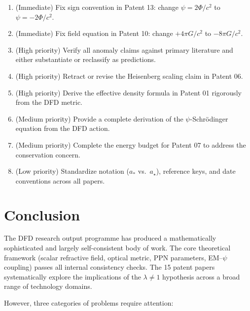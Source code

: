 \documentclass[12pt,a4paper]{article}
\begin{document}
\begin{enumerate}
\item[\textbf{P0}] (Immediate) Fix sign convention in Patent 13: change
$\psi = 2\Phi/c^2$ to $\psi = -2\Phi/c^2$.

\item[\textbf{P0}] (Immediate) Fix field equation in Patent 10: change
$+4\pi G/c^2$ to $-8\pi G/c^2$.

\item[\textbf{P1}] (High priority) Verify all anomaly claims against
primary literature and either substantiate or reclassify as predictions.

\item[\textbf{P1}] (High priority) Retract or revise the Heisenberg
scaling claim in Patent 06.

\item[\textbf{P1}] (High priority) Derive the effective density formula
in Patent 01 rigorously from the DFD metric.

\item[\textbf{P2}] (Medium priority) Provide a complete derivation of
the $\psi$-Schr\"{o}dinger equation from the DFD action.

\item[\textbf{P2}] (Medium priority) Complete the energy budget for
Patent 07 to address the conservation concern.

\item[\textbf{P3}] (Low priority) Standardize notation ($a_*$ vs.\
$a_\star$), reference keys, and date conventions across all papers.
\end{enumerate}

\section{Conclusion}

The DFD research output programme has produced a mathematically sophisticated
and largely self-consistent body of work. The core theoretical framework
(scalar refractive field, optical metric, PPN parameters, EM--$\psi$ coupling)
passes all internal consistency checks. The 15 patent papers systematically
explore the implications of the $\lambda \neq 1$ hypothesis across a broad
range of technology domains.

However, three categories of problems require attention:
\end{document}

